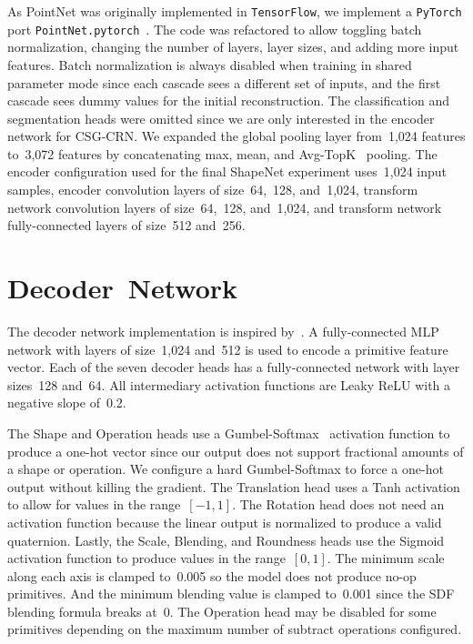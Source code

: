 As PointNet was originally implemented in \texttt{TensorFlow}, we implement a \texttt{PyTorch} port \texttt{PointNet.pytorch}~\cite{Xia2017}. The code was refactored to allow toggling batch normalization, changing the number of layers, layer sizes, and adding more input features. Batch normalization is always disabled when training in shared parameter mode since each cascade sees a different set of inputs, and the first cascade sees dummy values for the initial reconstruction. The classification and segmentation heads were omitted since we are only interested in the encoder network for CSG-CRN. We expanded the global pooling layer from~1,024 features to~3,072 features by concatenating max, mean, and Avg-TopK~\cite{Ozdemir2023} pooling. The encoder configuration used for the final ShapeNet experiment uses~1,024 input samples, encoder convolution layers of size~64,~128, and~1,024, transform network convolution layers of size~64,~128, and~1,024, and transform network fully-connected layers of size~512 and~256.


\section{Decoder~Network}
\label{sec:decoder_network_implementation}

The decoder network implementation is inspired by~\cite{Paschalidou2019}. A fully-connected MLP network with layers of size~1,024 and~512 is used to encode a primitive feature vector. Each of the seven decoder heads has a fully-connected network with layer sizes~128 and~64. All intermediary activation functions are Leaky ReLU with a negative slope of~0.2.

The Shape and Operation heads use a Gumbel-Softmax~\cite{Jang2017} activation function to produce a one-hot vector since our output does not support fractional amounts of a shape or operation. We configure a hard Gumbel-Softmax to force a one-hot output without killing the gradient. The Translation head uses a Tanh activation to allow for values in the range~$[-1, 1]$. The Rotation head does not need an activation function because the linear output is normalized to produce a valid quaternion. Lastly, the Scale, Blending, and Roundness heads use the Sigmoid activation function to produce values in the range~$[0, 1]$. The minimum scale along each axis is clamped to~0.005 so the model does not produce no-op primitives. And the minimum blending value is clamped to~0.001 since the SDF blending formula breaks at~0. The Operation head may be disabled for some primitives depending on the maximum number of subtract operations configured.

